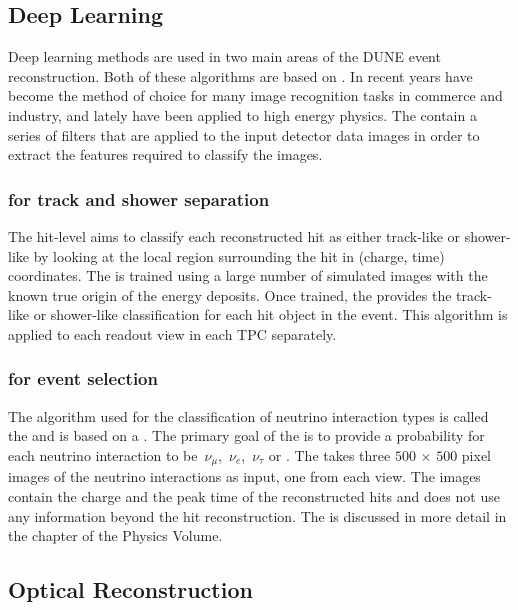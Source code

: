 \subsection{Deep Learning}\label{sec:deeplearning}

Deep learning methods are used %
in two main areas of the DUNE event reconstruction. %
Both of these algorithms are based on . 
In recent years  have become the method of choice for many image recognition tasks in commerce and industry, and lately have been applied to high energy physics. The  contain a series of filters that are applied to the input detector data images in order to extract the features required to classify the images.

\subsubsection{ for track and shower separation}
The hit-level  aims to classify each reconstructed hit as either track-like or shower-like by looking at the local region surrounding the hit in (charge, time) coordinates.  The  is trained using a large number of simulated images with the known true origin of the energy deposits. Once trained, the  provides the track-like or shower-like classification for each hit object in the event. This algorithm is applied to each readout view in each TPC separately. %

\subsubsection{ for event selection}
The algorithm used for the classification of neutrino interaction types is called the  and is  based on a . The primary goal of the  is to provide a probability for each neutrino interaction to be $\,\nu_\mu$, $\,\nu_e$, $\,\nu_\tau$ or . The  takes three $500\,\times\,500$ pixel images of the neutrino interactions as input, one from each view. The images contain the charge and the peak time of the reconstructed hits and does not use any information beyond the hit reconstruction. The  is discussed in more detail in the  chapter of the  Physics Volume. 

\subsection{Optical Reconstruction}

